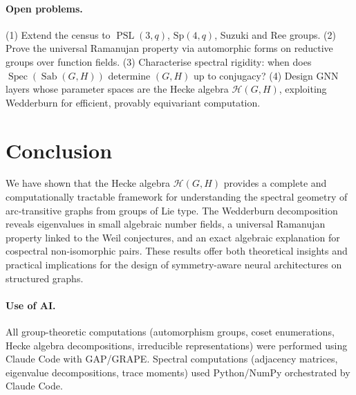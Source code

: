 \documentclass[mlmain]{jmlr}
\newcommand{\Sab}{\operatorname{Sab}}
\newcommand{\PSL}{\operatorname{PSL}}
\newcommand{\HH}{\mathcal{H}}
\newcommand{\Spec}{\operatorname{Spec}}
\begin{document}
\paragraph{Open problems.}
(1) Extend the census to $\PSL(3,q)$, $\mathrm{Sp}(4,q)$,
Suzuki and Ree groups.
(2) Prove the universal Ramanujan property via automorphic
forms on reductive groups over function fields.
(3) Characterise spectral rigidity: when does
$\Spec(\Sab(G,H))$ determine $(G,H)$ up to conjugacy?
(4) Design GNN layers whose parameter spaces are
the Hecke algebra $\HH(G,H)$, exploiting Wedderburn for
efficient, provably equivariant computation.


\section{Conclusion}
\label{sec:conclusion}

We have shown that the Hecke algebra $\HH(G,H)$ provides a
complete and computationally tractable framework for
understanding the spectral geometry of arc-transitive graphs
from groups of Lie type.  The Wedderburn decomposition
reveals eigenvalues in small algebraic number fields,
a universal Ramanujan property linked to the Weil conjectures,
and an exact algebraic explanation for cospectral
non-isomorphic pairs.  These results offer both theoretical
insights and practical implications for the design of
symmetry-aware neural architectures on structured graphs.


\paragraph{Use of AI.}
All group-theoretic computations (automorphism groups,
coset enumerations, Hecke algebra decompositions, irreducible
representations) were performed using Claude Code with
GAP/GRAPE.  Spectral computations (adjacency matrices,
eigenvalue decompositions, trace moments) used Python/NumPy
orchestrated by Claude Code.



\end{document}
